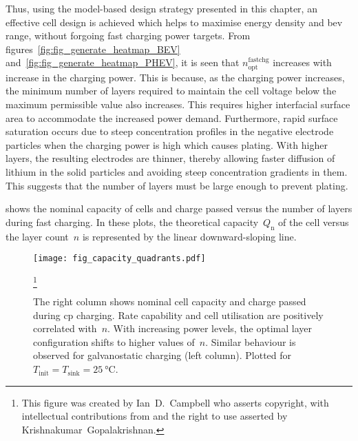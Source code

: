 Thus,   using    the   model-based    design   strategy   presented    in   this
chapter,   an   effective    cell   design   is   achieved    which   helps   to
maximise   energy   density  and   \gls{bev}   range,   without  forgoing   fast
charging   power    targets.   From   figures~\ref{fig:fig_generate_heatmap_BEV}
and~\ref{fig:fig_generate_heatmap_PHEV},       it       is       seen       that
$n^\text{fastchg}_\text{opt}$  increases with  increase in  the charging  power.
This is because,  as the charging power increases, the  minimum number of layers
required to maintain  the cell voltage below the maximum  permissible value also
increases.  This requires  higher interfacial  surface area  to accommodate  the
increased  power demand.  Furthermore, rapid  surface saturation  occurs due  to
steep  concentration  profiles in  the  negative  electrode particles  when  the
charging power is  high which causes plating. With higher  layers, the resulting
electrodes  are thinner,  thereby allowing  faster diffusion  of lithium  in the
solid  particles  and  avoiding  steep concentration  gradients  in  them.  This
suggests that the number of layers must be large enough to prevent plating.

 shows the nominal  capacity of cells and charge
passed versus  the number of  layers during fast  charging. In these  plots, the
theoretical  capacity~$Q_\text{n}$ of  the cell  versus the  layer count~$n$  is
represented by the linear downward-sloping line.

\begin{figure}[!bp]
    \begin{minipage}[t]{\textwidth}
        \centering
        \texttt{[image: fig\_capacity\_quadrants.pdf]}
        \captionsetup{labelsep=note}
        \caption[
        Nominal capacity and charge passed versus layer count for ---
        \emph{a}) constant current  charging and \emph{b}) constant power  charging
        ]
        {
            The right column shows nominal cell capacity and charge passed
            during \gls{cp} charging. Rate capability and cell utilisation are positively
            correlated with~$n$. With increasing power levels, the optimal layer configuration shifts to higher
            values of~$n$. Similar behaviour is observed for galvanostatic
            charging (left column). Plotted for~${T_\text{init} =
            T_\text{sink} = \SI{25}{\degreeCelsius}}$.
        }
        \label{fig:fig_CapacityQuadrants}
        \mpfootnotes[1]
        \footnote{This figure was created by \mbox{Ian D.\ Campbell} who asserts copyright,
            with intellectual contributions from and the right to use asserted by
        \mbox{Krishnakumar Gopalakrishnan}.}
    \end{minipage}
\end{figure}

